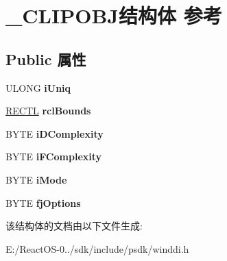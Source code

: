 \hypertarget{struct___c_l_i_p_o_b_j}{}\section{\+\_\+\+C\+L\+I\+P\+O\+B\+J结构体 参考}
\label{struct___c_l_i_p_o_b_j}
\subsection*{Public 属性}
\begin{DoxyCompactItemize}
\item 
\mbox{\label{struct___c_l_i_p_o_b_j_a3f5ca1604d733f4d0cca5a0c5be6b05a}} 
U\+L\+O\+NG {\bfseries i\+Uniq}
\item 
\mbox{\label{struct___c_l_i_p_o_b_j_a0e9c8e3057b2b2c05b200df927539e2d}} 
\hyperlink{struct___r_e_c_t_l}{R\+E\+C\+TL} {\bfseries rcl\+Bounds}
\item 
\mbox{\label{struct___c_l_i_p_o_b_j_a0941789f9a78f874083c448e048f62d5}} 
B\+Y\+TE {\bfseries i\+D\+Complexity}
\item 
\mbox{\label{struct___c_l_i_p_o_b_j_a1fc000ba525682020be85ec024cab272}} 
B\+Y\+TE {\bfseries i\+F\+Complexity}
\item 
\mbox{\label{struct___c_l_i_p_o_b_j_a3c8b2f11dac602c604884698be078bd7}} 
B\+Y\+TE {\bfseries i\+Mode}
\item 
\mbox{\label{struct___c_l_i_p_o_b_j_ab57ed5d1844a199e1410f1e82456cf69}} 
B\+Y\+TE {\bfseries fj\+Options}
\end{DoxyCompactItemize}


该结构体的文档由以下文件生成\+:\begin{DoxyCompactItemize}
\item 
E\+:/\+React\+O\+S-\/0../sdk/include/psdk/winddi.\+h\end{DoxyCompactItemize}
